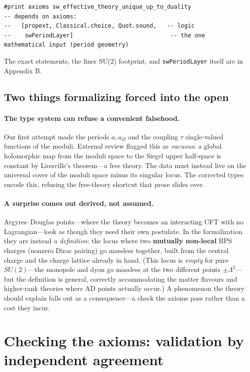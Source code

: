 \documentclass[11pt]{article}
\newcommand{\code}[1]{\texttt{#1}}
\begin{document}
\begin{Verbatim}
#print axioms sw_effective_theory_unique_up_to_duality
-- depends on axioms:
--   [propext, Classical.choice, Quot.sound,   -- logic
--    swPeriodLayer]                            -- the one mathematical input (period geometry)
\end{Verbatim}

\noindent The exact statements, the finer SU(2) footprint, and \code{swPeriodLayer} itself are in
Appendix B.

\subsection{Two things formalizing forced into the open}

\paragraph{The type system can refuse a convenient falsehood.} Our first attempt made the
periods $a, a_D$ and the coupling $\tau$ single-valued functions of the moduli. External review
flagged this as \emph{vacuous}: a global holomorphic map from the moduli space to the Siegel
upper half-space is constant by Liouville's theorem---a free theory. The data must instead live
on the universal cover of the moduli space minus its singular locus. The corrected types encode
this, refusing the free-theory shortcut that prose slides over.

\paragraph{A surprise comes out derived, not assumed.} Argyres--Douglas points---where the
theory becomes an interacting CFT with no Lagrangian---look as though they need their own
postulate. In the formalization they are instead a \emph{definition}: the locus where two
\textbf{mutually non-local} BPS charges (nonzero Dirac pairing) go massless together, built
from the central charge and the charge lattice already in hand. (This locus is \emph{empty} for
pure $SU(2)$---the monopole and dyon go massless at the two different points
$\pm\Lambda^2$---but the definition is general, correctly accommodating the matter flavours and
higher-rank theories where AD points actually occur.) A phenomenon the theory should explain
falls out as a consequence---a check the axioms pass rather than a cost they incur.

\section{Checking the axioms: validation by independent agreement}
\end{document}
